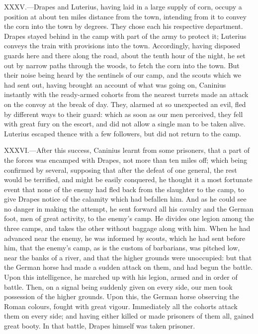 XXXV.—Drapes and Luterius, having laid in a large supply of corn,
occupy a position at about ten miles distance from the town, intending
from it to convey the corn into the town by degrees. They chose each his
respective department. Drapes stayed behind in the camp with part of the
army to protect it; Luterius conveys the train with provisions into the
town. Accordingly, having disposed guards here and there along the road,
about the tenth hour of the night, he set out by narrow paths through
the woods, to fetch the corn into the town. But their noise being heard
by the sentinels of our camp, and the scouts which we had sent out,
having brought an account of what was going on, Caninius instantly with
the ready-armed cohorts from the nearest turrets made an attack on the
convoy at the break of day. They, alarmed at so unexpected an evil, fled
by different ways to their guard: which as soon as our men perceived,
they fell with great fury on the escort, and did not allow a single man
to be taken alive. Luterius escaped thence with a few followers, but did
not return to the camp.

XXXVI.—After this success, Caninius learnt from some prisoners, that a
part of the forces was encamped with Drapes, not more than ten miles
off; which being confirmed by several, supposing that after the defeat
of one general, the rest would be terrified, and might be easily
conquered, he thought it a most fortunate event that none of the enemy
had fled back from the slaughter to the camp, to give Drapes notice of
the calamity which had befallen him. And as he could see no danger in
making the attempt, he sent forward all his cavalry and the German foot,
men of great activity, to the enemy's camp. He divides one legion among
the three camps, and takes the other without baggage along with him.
When he had advanced near the enemy, he was informed by scouts, which he
had sent before him, that the enemy's camp, as is the custom of
barbarians, was pitched low, near the banks of a river, and that the
higher grounds were unoccupied: but that the German horse had made a
sudden attack on them, and had begun the battle. Upon this intelligence,
he marched up with his legion, armed and in order of battle. Then, on a
signal being suddenly given on every side, our men took possession of
the higher grounds. Upon this, the German horse observing the Roman
colours, fought with great vigour. Immediately all the cohorts attack
them on every side; and having either killed or made prisoners of them
all, gained great booty. In that battle, Drapes himself was taken
prisoner.

